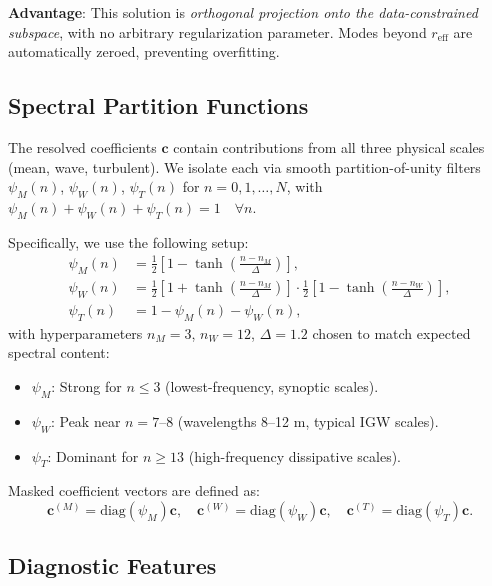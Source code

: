 \documentclass[11pt,a4paper]{article}
\begin{document}
\textbf{Advantage}: This solution is \emph{orthogonal projection onto the data-constrained subspace}, with no arbitrary regularization parameter. Modes beyond $r_{\mathrm{eff}}$ are automatically zeroed, preventing overfitting.

\subsection{Spectral Partition Functions}
\label{sec:methods:partition}

The resolved coefficients $\mathbf{c}$ contain contributions from all three physical scales (mean, wave, turbulent). We isolate each via smooth partition-of-unity filters $\psi_M(n)$, $\psi_W(n)$, $\psi_T(n)$ for $n = 0, 1, \ldots, N$, with $\psi_M(n) + \psi_W(n) + \psi_T(n) = 1 \quad \forall n$.

Specifically, we use the following setup:
\begin{align}
\psi_M(n) &= \frac{1}{2}\left[1 - \tanh\left(\frac{n - n_M}{\Delta}\right)\right], \label{eq:psi_m} \\
\psi_W(n) &= \frac{1}{2}\left[1 + \tanh\left(\frac{n - n_M}{\Delta}\right)\right] \cdot \frac{1}{2}\left[1 - \tanh\left(\frac{n - n_W}{\Delta}\right)\right], \label{eq:psi_w} \\
\psi_T(n) &= 1 - \psi_M(n) - \psi_W(n), \label{eq:psi_t}
\end{align}
with hyperparameters $n_M = 3$, $n_W = 12$, $\Delta = 1.2$ chosen to match expected spectral content:
\begin{itemize}
  \item $\psi_M$: Strong for $n \leq 3$ (lowest-frequency, synoptic scales).
  \item $\psi_W$: Peak near $n = 7$--$8$ (wavelengths 8--12 m, typical IGW scales).
  \item $\psi_T$: Dominant for $n \geq 13$ (high-frequency dissipative scales).
\end{itemize}

Masked coefficient vectors are defined as:
\begin{equation}
\mathbf{c}^{(M)} = \text{diag}(\psi_M) \mathbf{c}, \quad \mathbf{c}^{(W)} = \text{diag}(\psi_W) \mathbf{c}, \quad \mathbf{c}^{(T)} = \text{diag}(\psi_T) \mathbf{c}.
\end{equation}

\subsection{Diagnostic Features}
\label{sec:methods:diagnostics}
\end{document}
